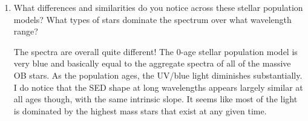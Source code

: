 \documentclass[11pt]{article}
\begin{document}
\begin{enumerate}
\begin{enumerate}
\begin{figure}[h!]
\centering
\end{figure}


  \item What differences and similarities do you notice across these
    stellar population models?  What types of stars dominate the
    spectrum over what wavelength range?

{\color{gray} The spectra are overall quite different!  The 0-age
  stellar population model is very blue and basically equal to the
  aggregate spectra of all of the massive OB stars.  As the population
  ages, the UV/blue light diminishes substantially.  I do notice that
  the SED shape at long wavelengths appears largely similar at all
  ages though, with the same intrinsic slope.  It seems like most of
  the light is dominated by the highest mass stars that exist at any
  given time.}

\end{enumerate}
\end{enumerate}
\end{document}
